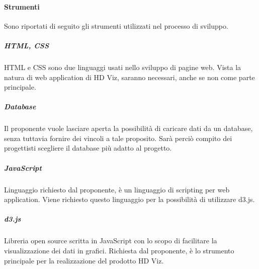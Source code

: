 \documentclass[../norme_di_progetto.tex]{subfiles}
\begin{document}
 \paragraph{Strumenti}
 Sono riportati di seguito gli strumenti utilizzati nel processo di sviluppo.
 
 \subparagraph{HTML, CSS}
 HTML e CSS sono due linguaggi usati nello sviluppo di pagine web. Vista la natura di web application di HD Viz, saranno necessari, anche se non come parte principale.
 
 \subparagraph{Database}
 Il proponente vuole lasciare aperta la possibilità di caricare dati da un database, senza tuttavia fornire dei vincoli a tale proposito. Sarà perciò compito dei progettisti scegliere il database più adatto al progetto.
 
 \subparagraph{JavaScript}
 Linguaggio richiesto dal proponente, è un linguaggio di scripting per web application. Viene richiesto questo linguaggio per la possibilità di utilizzare d3.js.
 
 \subparagraph{d3.js}
 Libreria open source scritta in JavaScript con lo scopo di facilitare la visualizzazione dei dati in grafici. Richiesta dal proponente, è lo strumento principale per la realizzazione del prodotto HD Viz.
 
\end{document}
